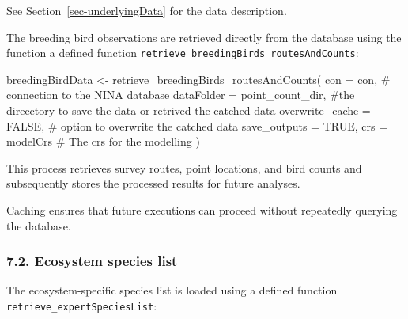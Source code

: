 \documentclass[
  letterpaper,
  DIV=11,
  numbers=noendperiod]{scrartcl}
\newenvironment{Shaded}{\begin{snugshade}}{\end{snugshade}}
\newcommand{\AttributeTok}[1]{\textcolor[rgb]{0.40,0.45,0.13}{#1}}
\newcommand{\CommentTok}[1]{\textcolor[rgb]{0.37,0.37,0.37}{#1}}
\newcommand{\ConstantTok}[1]{\textcolor[rgb]{0.56,0.35,0.01}{#1}}
\newcommand{\DecValTok}[1]{\textcolor[rgb]{0.68,0.00,0.00}{#1}}
\newcommand{\FunctionTok}[1]{\textcolor[rgb]{0.28,0.35,0.67}{#1}}
\newcommand{\NormalTok}[1]{\textcolor[rgb]{0.00,0.23,0.31}{#1}}
\newcommand{\OtherTok}[1]{\textcolor[rgb]{0.00,0.23,0.31}{#1}}
\newcommand{\SpecialCharTok}[1]{\textcolor[rgb]{0.37,0.37,0.37}{#1}}
\begin{document}
See Section~\ref{sec-underlyingData} for the data description.

The breeding bird observations are retrieved directly from the database
using the function a defined function
\texttt{retrieve\_breedingBirds\_routesAndCounts}:

\begin{Shaded}
\begin{Highlighting}[]
\NormalTok{breedingBirdData }\OtherTok{\textless{}{-}} \FunctionTok{retrieve\_breedingBirds\_routesAndCounts}\NormalTok{(}
  \AttributeTok{con             =}\NormalTok{ con, }\CommentTok{\# connection to the NINA database}
  \AttributeTok{dataFolder      =}\NormalTok{ point\_count\_dir, }\CommentTok{\#the direectory to save the data or retrived the catched data}
  \AttributeTok{overwrite\_cache =} \ConstantTok{FALSE}\NormalTok{, }\CommentTok{\# option to overwrite the catched data}
  \AttributeTok{save\_outputs    =} \ConstantTok{TRUE}\NormalTok{,}
  \AttributeTok{crs             =}\NormalTok{ modelCrs }\CommentTok{\# The crs for the modelling}
\NormalTok{)}
\end{Highlighting}
\end{Shaded}

This process retrieves survey routes, point locations, and bird counts
and subsequently stores the processed results for future analyses.

Caching ensures that future executions can proceed without repeatedly
querying the database.

\subsubsection{7.2. Ecosystem species
list}\label{ecosystem-species-list-1}

The ecosystem-specific species list is loaded using a defined function
\texttt{retrieve\_expertSpeciesList}:

\begin{Shaded}
\end{Shaded}
\end{document}
